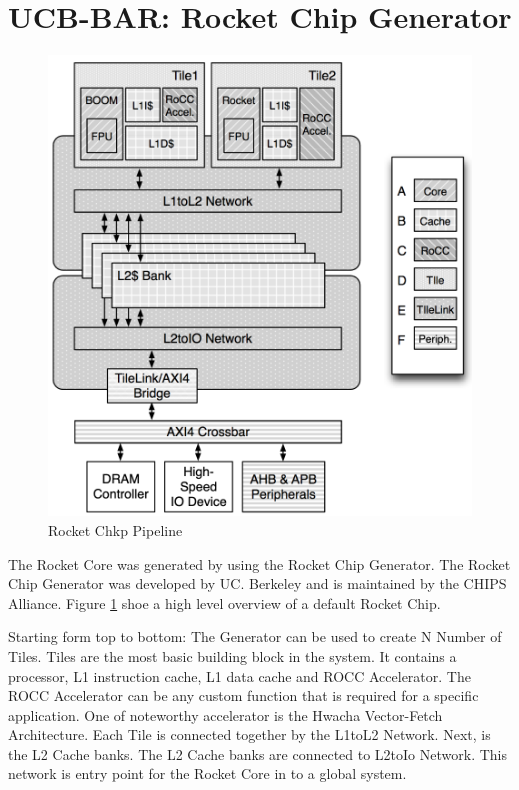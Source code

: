 \documentclass[../main.tex]{subfiles}
\begin{document}
\section{UCB-BAR: Rocket Chip Generator}
\begin{figure}
    \centering
    \includegraphics[scale=.5]{pngs/RocketChipGeneratorLayout.png}
    \caption{Rocket Chkp Pipeline\cite{Asanović:EECS-2016-17}}
    \label{fig:RocketCipGen}
\end{figure}

The Rocket Core was generated by using the Rocket Chip Generator. The Rocket Chip Generator was developed by UC. Berkeley and is maintained by the CHIPS Alliance. Figure \ref{fig:RocketCipGen} shoe a high level overview of a default Rocket Chip. 

Starting form top to bottom: The Generator can be used to create N Number of Tiles. Tiles are the most basic building block in the system. It contains a processor, L1 instruction cache, L1 data cache and ROCC Accelerator. The ROCC Accelerator can be any custom function that is required for a specific application. One of noteworthy accelerator is the Hwacha Vector-Fetch Architecture\cite{HwachaPaper}. Each Tile is connected together by the L1toL2 Network. Next, is the L2 Cache banks. The L2 Cache banks are connected to L2toIo Network. This network is entry point for the Rocket Core in to a global system.
\end{document}
